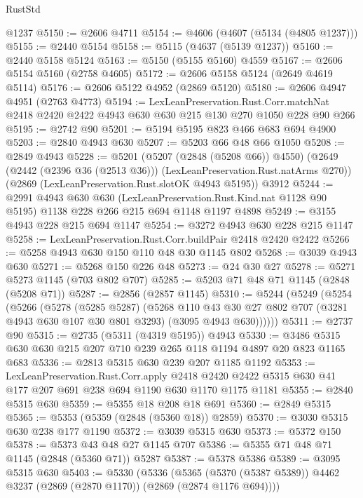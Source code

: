\begin{lexlean}{RustStd}
\begin{coremodule}
    @1237
@5150 := @2606 @4711
@5154 := @4606 (@4607 (@5134 (@4805 @1237)))
@5155 := @2440 @5154
@5158 := @5115 (@4637 (@5139 @1237))
@5160 := @2440 @5158 @5124
@5163 := @5150 (@5155 @5160) @4559
@5167 := @2606 @5154 @5160 (@2758 @4605)
@5172 := @2606 @5158 @5124 (@2649 @4619 @5114)
@5176 := @2606 @5122 @4952 (@2869 @5120)
@5180 := @2606 @4947 @4951 (@2763 @4773)
@5194 := LexLeanPreservation.Rust.Corr.matchNat
    @2418
    @2420
    @2422
    @4943
    @630
    @630
    @215
    @130
    @270
    @1050
    @228
    @90
    @266
@5195 := @2742 @90
@5201 := @5194 @5195 @823 @466 @683 @694 @4900
@5203 := @2840 @4943 @630
@5207 := @5203 @66 @48 @66 @1050
@5208 := @2849 @4943
@5228 := @5201
    (@5207 (@2848 (@5208 @66)) @4550)
    (@2649 (@2442 (@2396 @36 (@2513 @36))) (LexLeanPreservation.Rust.natArms @270))
    (@2869 (LexLeanPreservation.Rust.slotOK @4943 @5195))
    @3912
@5244 := @2991
    @4943
    @630
    @630
    (LexLeanPreservation.Rust.Kind.nat @1128 @90 @5195)
    @1138
    @228
    @266
    @215
    @694
    @1148
    @1197
    @4898
@5249 := @3155 @4943 @228 @215 @694 @1147
@5254 := @3272 @4943 @630 @228 @215 @1147
@5258 := LexLeanPreservation.Rust.Corr.buildPair @2418 @2420 @2422
@5266 := @5258 @4943 @630 @150 @110 @48 @30 @1145 @802
@5268 := @3039 @4943 @630
@5271 := @5268 @150 @226 @48
@5273 := @24 @30 @27
@5278 := @5271 @5273 @1145 (@703 @802 @707)
@5285 := @5203 @71 @48 @71 @1145 (@2848 (@5208 @71))
@5287 := @2856 (@2857 @1145)
@5310 := @5244
    (@5249
      (@5254
        (@5266
          (@5278
            (@5285 @5287)
            (@5268
              @110
              @43
              @30
              @27
              @802
              @707
              (@3281 @4943 @630 @107 @30 @801 @3293)
              (@3095 @4943 @630))))))
@5311 := @2737 @90
@5315 := @2735 (@5311 (@4319 @5195)) @4943
@5330 := @3486 @5315 @630 @630 @215 @207 @710 @239 @265 @118 @1194 @4897 @20 @823 @1165 @683
@5336 := @2813 @5315 @630 @239 @207 @1185 @1192
@5353 := LexLeanPreservation.Rust.Corr.apply
    @2418
    @2420
    @2422
    @5315
    @630
    @41
    @177
    @207
    @691
    @238
    @694
    @1190
    @630
    @1170
    @1175
    @1181
@5355 := @2840 @5315 @630
@5359 := @5355 @18 @208 @18 @691
@5360 := @2849 @5315
@5365 := @5353 (@5359 (@2848 (@5360 @18)) @2859)
@5370 := @3030 @5315 @630 @238 @177 @1190
@5372 := @3039 @5315 @630
@5373 := @5372 @150
@5378 := @5373 @43 @48 @27 @1145 @707
@5386 := @5355 @71 @48 @71 @1145 (@2848 (@5360 @71)) @5287
@5387 := @5378 @5386
@5389 := @3095 @5315 @630
@5403 := @5330
    (@5336
      (@5365 (@5370 (@5387 @5389)) @4462 @3237 (@2869 (@2870 @1170)) (@2869 (@2874 @1176 @694))))

\end{coremodule}
\end{lexlean}
